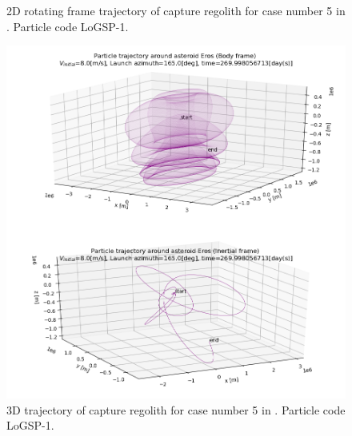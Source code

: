 \documentclass[print]{tudelft-report}
\begin{document}
\begin{appendices}
\begin{figure}[htb]
    \caption{2D rotating frame trajectory of capture regolith for case number 5 in . Particle code LoGSP-1.}
    \label{fig:LoGSP_1_capture_case_5_2d_traj_bodyFrame}
    \end{figure}
    \FloatBarrier
    \begin{figure}[htb]
    \centering
    \captionsetup{justification=centering}
    \includegraphics[width=\textwidth, height=\textheight]{Results/Images/longest_edge_perturbations/3.2Density_1cmSize/3dTrajectory_8ms_165Azimuth_45solarPhase.png}
    \caption{3D trajectory of capture regolith for case number 5 in . Particle code LoGSP-1.}
    \label{fig:LoGSP_1_capture_case_8_3d_trajectory}
    \end{figure}
    \FloatBarrier
    \begin{figure}[htb]
    \centering
    \captionsetup{justification=centering}

\end{figure}
\end{appendices}
\end{document}
